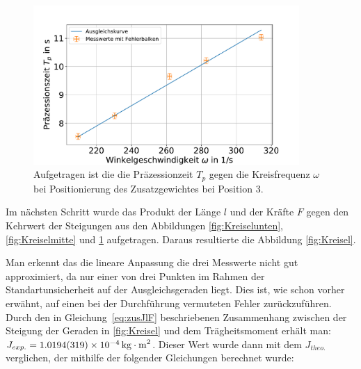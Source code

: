 \begin{figure}[h]
	\centering
	\includegraphics[width=0.9\textwidth]{res/sproHzoben.pdf}
	\caption{Aufgetragen ist die die Präzessionzeit $T_p$ gegen die Kreisfrequenz $\omega$ bei Positionierung des Zusatzgewichtes bei Position 3.}
		\label{fig:Kreiseloben}
	\end{figure}
Im nächsten Schritt wurde das Produkt der Länge $l$ und der Kräfte $F$ gegen den Kehrwert der Steigungen aus den Abbildungen  \ref{fig:Kreiselunten}, \ref{fig:Kreiselmitte} und \ref{fig:Kreiseloben} aufgetragen. 
Daraus resultierte die Abbildung \ref{fig:Kreisel}.

Man erkennt das die lineare Anpassung die drei Messwerte nicht gut approximiert, da nur einer von drei Punkten im Rahmen der Standartunsicherheit auf der Ausgleichsgeraden liegt. Dies ist, wie schon vorher erwähnt, auf einen bei der Durchführung vermuteten Fehler zurückzuführen.
Durch den in Gleichung~\ref{eq:zusJlF} beschriebenen Zusammenhang zwischen der Steigung der Geraden in \cref{fig:Kreisel} und dem Trägheitsmoment erhält man:  $J_{exp.}=\SI{1,0194+-0,0319e-4}{kg \cdot m^2}$. 
Dieser Wert wurde dann mit dem $J_{theo.}$ verglichen, der mithilfe der folgender Gleichungen berechnet wurde:

